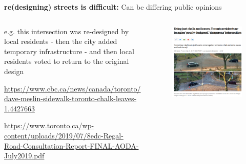 \documentclass[aspectratio=169]{beamer}
\begin{document}
\begin{frame}
	
	\textbf{re(designing) streets is difficult:} Can be differing public opinions
	
	\vspace{2mm}
	
	
	
		
	
	\begin{columns}
		\begin{column}{0.35\textwidth}
			
			e.g. this intersection was re-designed by local residents - then the city added temporary infrastructure - and then local residents voted to return to the original design
			
			\vspace{2mm}
			
			\tiny\url{https://www.cbc.ca/news/canada/toronto/dave-meslin-sidewalk-toronto-chalk-leaves-1.4427663}
			
			\vspace{2mm}
			
			\tiny\url{https://www.toronto.ca/wp-content/uploads/2019/07/8edc-Regal-Road-Consultation-Report-FINAL-AODA-July2019.pdf}
			
			
			
		\end{column}
		
		\begin{column}{0.65\textwidth}
			\begin{figure}
				\centering
				\includegraphics[width=0.9\linewidth]{images/leaves_road.png}
			\end{figure}
			
			
			
		\end{column}
		
		
		
	\end{columns}
	
	
\end{frame}
\end{document}
